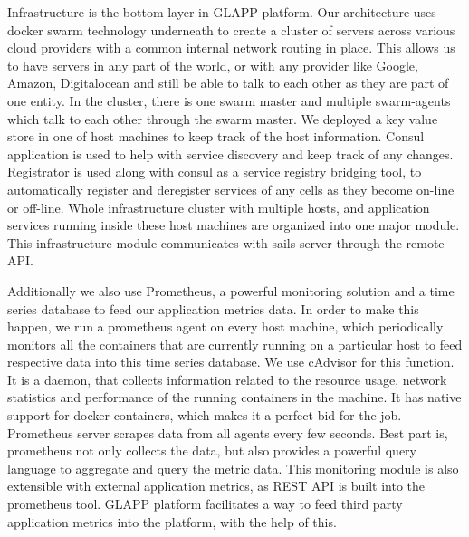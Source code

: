 \documentclass{seal_thesis}
\begin{document}
Infrastructure is the bottom layer in GLAPP platform. 
Our architecture uses docker swarm technology underneath to create a cluster of servers across various cloud providers with a common internal network routing in place. 
This allows us to have servers in any part of the world, or with any provider like Google, Amazon, Digitalocean and still be able to talk to each other as they are part of one entity. 
In the cluster, there is one swarm master and multiple swarm-agents which talk to each other through the swarm master. 
We deployed a key value store in one of host machines to keep track of the host information. 
Consul application is used to help with service discovery and keep track of any changes. 
Registrator is used along with consul as a service registry bridging tool, to automatically register and deregister services of any cells as they become on-line or off-line. 
Whole infrastructure cluster with multiple hosts, and application services running inside these host machines are organized into one major module. 
This infrastructure module communicates with sails server through the remote API. 

Additionally we also use Prometheus, a powerful monitoring solution and a time series database to feed our application metrics data. 
In order to make this happen, we run a prometheus agent on every host machine, which periodically monitors all the containers that are currently running on a particular host to feed respective data into this time series database. 
We use cAdvisor for this function. 
It is a daemon, that collects information related to the resource usage, network statistics and performance of the running containers in the machine. 
It has native support for docker containers, which makes it a perfect bid for the job. 
Prometheus server scrapes data from all agents every few seconds. 
Best part is, prometheus not only collects the data, but also provides a powerful query language to aggregate and query the metric data. 
This monitoring module is also extensible with external application metrics, as REST API is built into the prometheus tool. 
GLAPP platform facilitates a way to feed third party application metrics into the platform, with the help of this.
\end{document}
